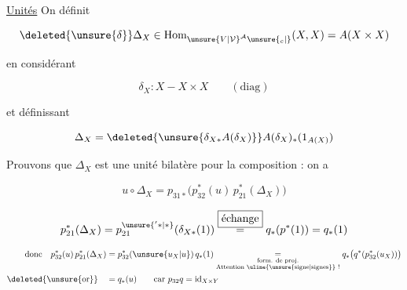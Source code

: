 \uline{Unités} On définit

\[
\deleted{\unsure{\delta}}\Delta_X\in\operatorname{Hom}_{\unsure{V|\mathcal V}^{\mathcal A}\unsure{{}_{c}|{}}}(X,X)=A(X\times X)
\]

en considérant

\[
\delta_X:X\mathbin{-}X\times X\qquad(\text{diag})
\]

et définissant

\[
\Delta_X=\deleted{\unsure{\delta_{X*}A(\delta_X)}}A(\delta_X)_*(1_{A(X)})
\]

Prouvons que $\Delta_X$ est une unité bilatère pour la composition : on a


\[
u\circ\Delta_X=p_{31*}\bigl(p_{32}^*(u)\,p_{21}^*(\Delta_X)\bigr)
\]


\[
p_{21}^*(\Delta_X)=p_{21}^{\unsure{'*|*}}(\delta_{X*}(1))\overset{\boxed{\text{échange}}}{=}q_*(p^*(1))=q_*(1)
\]

\[
\begin{aligned}
\text{donc}\quad p_{32}^*(u)\,p_{21}^*(\Delta_X)&=p_{32}^*(\unsure{u_X|u})\,q_*(1)
\underset{\substack{\text{form. de proj.}\\\text{Attention \uline{\unsure{signe|signes}} !}}}{=}q_*\bigl(q^*(p_{32}^*(u_X))\bigr)\\
\deleted{\unsure{\text{or}}}\quad&=q_*(u)\qquad\text{car }p_{32}q=\mathrm{id}_{X\times Y}
\end{aligned}
\]



